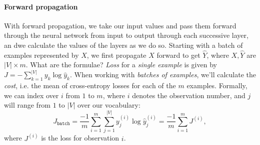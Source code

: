 \documentclass[12pt]{article}
\begin{document}
\paragraph{Forward propagation} 
With forward propagation, we take our input values and pass them forward through the neural network from input to output through each successive layer, an dwe calculate the values of the layers as we do so. Starting with a batch of examples represented by $X$, we first propagate $X$ forward to get $\hat Y$, where $X, \hat Y$ are $|V| \times m$. What are the formulae? \emph{Loss} for a \emph{single example} is given by $J = -\sum_{k=1}^{|V|} y_k \log \hat y_k$. When working with \emph{batches of examples}, we'll calculate the \emph{cost}, i.e. the mean of cross-entropy losses for each of the $m$ examples. Formally, we can index over $i$ from $1$ to $m$, where $i$ denotes the observation number, and $j$ will range from $1$ to $|V|$ over our vocabulary:
\[
  J_{\texttt{batch}} = \frac{-1}{m} \sum_{i=1}^{m} \sum_{j=1}^{|V|} y_j^{(i)} \log \hat y_j^{(i)} = \frac{-1}{m} \sum_{i=1}^{m} J^{(i)},
\]
where $J^{(i)}$ is the loss for observation $i$.
\end{document}
